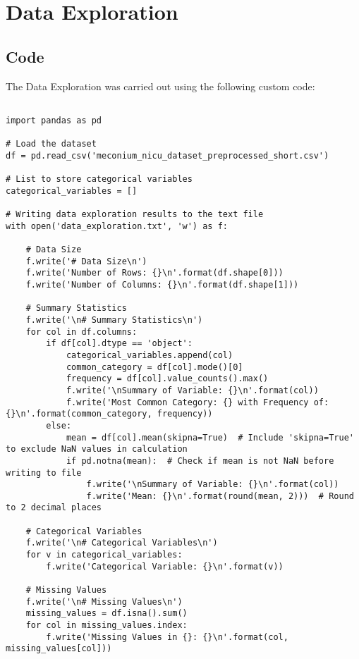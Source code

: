 \documentclass[11pt]{article}
\begin{document}
\section{Data Exploration} \subsection{Code}The Data Exploration was carried out using the following custom code:

\begin{verbatim}

import pandas as pd

# Load the dataset
df = pd.read_csv('meconium_nicu_dataset_preprocessed_short.csv')

# List to store categorical variables
categorical_variables = []

# Writing data exploration results to the text file
with open('data_exploration.txt', 'w') as f:
    
    # Data Size
    f.write('# Data Size\n')
    f.write('Number of Rows: {}\n'.format(df.shape[0]))
    f.write('Number of Columns: {}\n'.format(df.shape[1]))

    # Summary Statistics
    f.write('\n# Summary Statistics\n')
    for col in df.columns:
        if df[col].dtype == 'object':
            categorical_variables.append(col)
            common_category = df[col].mode()[0]
            frequency = df[col].value_counts().max()
            f.write('\nSummary of Variable: {}\n'.format(col))
            f.write('Most Common Category: {} with Frequency of: {}\n'.format(common_category, frequency))
        else:
            mean = df[col].mean(skipna=True)  # Include 'skipna=True' to exclude NaN values in calculation
            if pd.notna(mean):  # Check if mean is not NaN before writing to file
                f.write('\nSummary of Variable: {}\n'.format(col))
                f.write('Mean: {}\n'.format(round(mean, 2)))  # Round to 2 decimal places
    
    # Categorical Variables
    f.write('\n# Categorical Variables\n')
    for v in categorical_variables:
        f.write('Categorical Variable: {}\n'.format(v))
      
    # Missing Values
    f.write('\n# Missing Values\n')
    missing_values = df.isna().sum()
    for col in missing_values.index:
        f.write('Missing Values in {}: {}\n'.format(col, missing_values[col]))

\end{verbatim}
\end{document}
